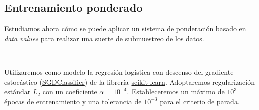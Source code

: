 \renewcommand{\arraystretch}{2}
\begin{table}[ht!]
    \centering
    \captionsetup{width=\linewidth,justification=justified}
    \caption{Comparación de los valores de $F1$ de los modelos
    relacionada con su habilidad para detectar datos mal etiquetados.
    Se comparan los siete métodos de valoración en los cinco datasets
    de clasificación.}
    \label{tab:resultados}
\end{table}


\subsection{Entrenamiento ponderado}

Estudiamos ahora cómo se puede aplicar un sistema de
ponderación basado en \textit{data values} para realizar
una suerte de submuestreo de los datos.

\

Utilizaremos como modelo la regresión logística con
descenso del gradiente estocástico
(\href{https://acortar.link/bclshR}{SGDClassifier}) de la librería
\href{https://scikit-learn.org/stable/index.html}{scikit-learn}.
Adoptaremos regularización estándar $L_2$ con un coeficiente
$\alpha = 10^{-4}$. Estableceremos un máximo de $10^3$ épocas
de entrenamiento y una tolerancia de $10^{-3}$ para el criterio
de parada.

